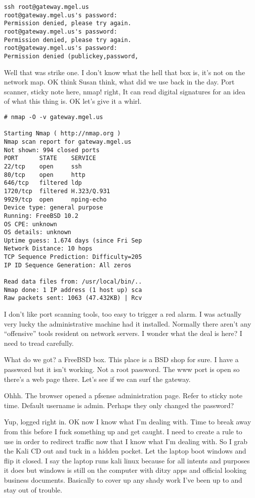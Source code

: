 \begin{verbatim}
ssh root@gateway.mgel.us
root@gateway.mgel.us's password: 
Permission denied, please try again.
root@gateway.mgel.us's password: 
Permission denied, please try again.
root@gateway.mgel.us's password: 
Permission denied (publickey,password,
\end{verbatim}

Well that was strike one. I don't know what the hell that box is, it's not on the network map. OK think Susan think, what did we use back in the day. Port scanner, sticky note here, nmap! right, It can read digital signatures for an idea of what this thing is. OK let's give it a whirl.

\begin{verbatim}
# nmap -O -v gateway.mgel.us

Starting Nmap ( http://nmap.org )
Nmap scan report for gateway.mgel.us 
Not shown: 994 closed ports
PORT      STATE    SERVICE
22/tcp    open     ssh
80/tcp    open     http
646/tcp   filtered ldp
1720/tcp  filtered H.323/Q.931
9929/tcp  open     nping-echo
Device type: general purpose
Running: FreeBSD 10.2
OS CPE: unknown
OS details: unknown
Uptime guess: 1.674 days (since Fri Sep
Network Distance: 10 hops
TCP Sequence Prediction: Difficulty=205
IP ID Sequence Generation: All zeros

Read data files from: /usr/local/bin/..
Nmap done: 1 IP address (1 host up) sca
Raw packets sent: 1063 (47.432KB) | Rcv
\end{verbatim}

I don't like port scanning tools, too easy to trigger a red alarm. I was actually very lucky the administrative machine had it installed. Normally there aren't any ``offensive'' tools resident on network servers. I wonder what the deal is here? I need to tread carefully.

What do we got? a FreeBSD box. This place is a BSD shop for sure. I have a password but it isn't working. Not a root password. The www port is open so there's a web page there. Let's see if we can surf the gateway.

Ohhh. The browser opened a pfsense administration page. Refer to sticky note time. Default username is admin. Perhaps they only changed the password?

Yup, logged right in. OK now I know what I'm dealing with. Time to break away from this before I fuck something up and get caught. I need to create a rule to use in order to redirect traffic now that I know what I'm dealing with. So I grab the Kali CD out and tuck in a hidden pocket. Let the laptop boot windows and flip it closed. I say the laptop runs kali linux because for all intents and purposes it does but windows is still on the computer with ditzy apps and official looking business documents. Basically to cover up any shady work I've been up to and stay out of trouble.

